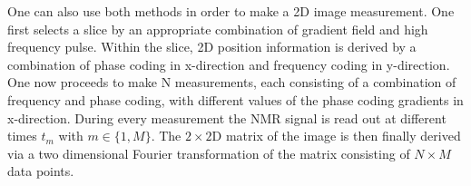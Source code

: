 One can also use both methods in order to make a 2D image measurement. One first selects a slice by an appropriate combination of gradient field and high frequency pulse. Within the slice, 2D position information is derived by a combination of phase coding in x-direction and frequency coding in y-direction. One now proceeds to make N measurements, each consisting of a combination of frequency and phase coding, with different values of the phase coding gradients in x-direction. During every measurement the NMR signal is read out at different times $t_m$ with $m \in \{1,M\}$. The $2\times2$D matrix of the image is then finally derived via a two dimensional Fourier transformation of the matrix consisting of $N\times M$ data points.\cite{manual} \cite{ernst1987principles}